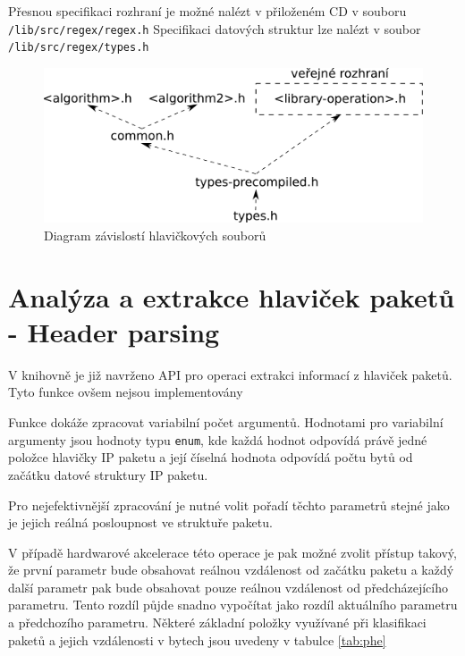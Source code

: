 Přesnou specifikaci rozhraní je možné nalézt v přiloženém CD v souboru \texttt{/lib/src/regex/regex.h}
Specifikaci datových struktur lze nalézt v soubor \texttt{/lib/src/regex/types.h}

\begin{figure}[!htbp]
	\centering
	\includegraphics[scale=.25]{fig/header-dependencies.pdf}
	\caption{Diagram závislostí hlavičkových souborů}
\end{figure}\label{fig:header-dependecies}

\section{Analýza a extrakce hlaviček paketů - Header parsing} %

V knihovně je již navrženo API pro operaci extrakci informací z hlaviček paketů. Tyto
funkce ovšem nejsou implementovány


Funkce dokáže zpracovat variabilní počet argumentů.
Hodnotami pro variabilní argumenty jsou hodnoty typu \texttt{enum}, kde každá hodnot odpovídá
právě jedné položce hlavičky IP paketu a její číselná hodnota odpovídá počtu bytů
od začátku datové struktury IP paketu.

Pro nejefektivnější zpracování je nutné volit pořadí těchto parametrů stejné jako je jejich reálná
posloupnost ve struktuře paketu.

V případě hardwarové akcelerace této operace je pak možné zvolit přístup takový,
že první parametr bude obsahovat reálnou vzdálenost od začátku paketu a každý další parametr
pak bude obsahovat pouze reálnou vzdálenost od předcházejícího parametru. Tento rozdíl
půjde snadno vypočítat jako rozdíl aktuálního parametru a předchozího parametru.
Některé základní položky využívané při klasifikaci paketů a jejich vzdálenosti v bytech
jsou uvedeny v tabulce \ref{tab:phe}

